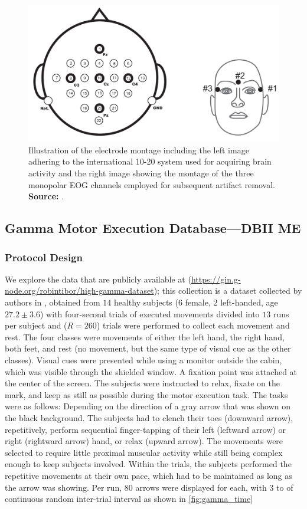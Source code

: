 \begin{figure}[h!]
\centering
    \includegraphics[width=0.6\linewidth]{Figures/preliminaries/bcielectrodes.PNG}
    \caption{Illustration of the electrode montage including the left image adhering to the international 10-20 system used for acquiring brain activity and the right image showing the montage of the three monopolar EOG channels employed for subsequent artifact removal. \textbf{Source:} \cite{brunner2008bci}. \label{fig:montagebci2a}}
\end{figure}

\subsection{Gamma Motor Execution Database---DBII ME}

\subsubsection{Protocol Design}

We explore the data that are publicly available at (\url{https://gin.g-node.org/robintibor/high-gamma-dataset}); this collection is a dataset collected by authors in \cite{schirrmeister2017deep}, obtained from $14$ healthy subjects ($6$ female, $2$ left-handed, age $27.2\pm 3.6$) with four-second trials of executed movements divided into $13$ runs per subject and ($R = 260$) trials were performed to collect each movement and rest. The four classes were movements of either the left hand, the right hand, both feet, and rest (no movement, but the same type of visual cue as the other classes). Visual cues were presented while using a monitor outside the cabin, which was visible through the shielded window. A fixation point was attached at the center of the screen. The subjects were instructed to relax, fixate on the mark, and keep as still as possible during the motor execution task. The tasks were as follows: Depending on the direction of a gray arrow that was shown on the black background. The subjects had to clench their toes (downward arrow), repetitively, perform sequential finger-tapping of their left (leftward arrow) or right (rightward arrow) hand, or relax (upward arrow). The movements were selected to require little proximal muscular activity while still being complex enough to keep subjects involved. Within the  trials, the subjects performed the repetitive movements at their own pace, which had to be maintained as long as the arrow was showing. Per run, $80$ arrows were displayed for  each, with $3$ to  of continuous random inter-trial interval as shown in \cref{fig:gamma_time}

